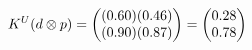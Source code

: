 \documentclass[preview]{standalone}
\begin{document}
\begin{align*}
\special{dvisvgm:raw <g id='unique000'>}K^U(d \otimes p) = \begin{pmatrix} (0.60)(0.46) \\ (0.90)(0.87) \end{pmatrix} = \begin{pmatrix} 0.28 \\ 0.78 \end{pmatrix}\special{dvisvgm:raw </g>}
\end{align*}
\end{document}
